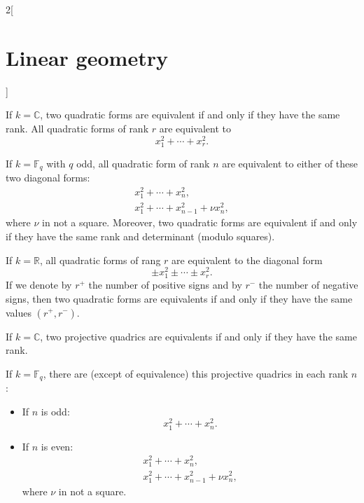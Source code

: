 \documentclass[class=article,10pt,crop=false]{standalone}
\begin{document}
\begin{multicols}{2}[\section{Linear geometry}]
\begin{prop}
\end{prop}
\begin{theorem}
If $k=\mathbb{C}$, two quadratic forms are equivalent if and only if they have the same rank. All quadratic forms of rank $r$ are equivalent to $$x_1^2+\cdots+x_r^2.$$
\end{theorem}
\begin{theorem}
If $k=\mathbb{F}_q$ with $q$ odd, all quadratic form
of rank $n$ are equivalent to either of these two diagonal forms: 
\begin{gather*}
    x_1^2+\cdots+ x_n^2,\\
    x_1^2+\cdots+ x_{n-1}^2+\nu x_n^2,
\end{gather*}
where $\nu$ in not a square. Moreover, two quadratic forms are equivalent if and only if they have the same rank and determinant (modulo squares).
\end{theorem}
\begin{theorem}
If $k=\mathbb{R}$, all quadratic forms
of rang $r$ are equivalent to the diagonal form 
$$\pm x_1^2\pm\cdots\pm x_r^2.$$ If we denote by $r^+$ the number of positive signs and by $r^-$ the number of negative signs, then two quadratic forms are equivalents if and only if they have the same values $(r^+,r^-)$.
\end{theorem}
\begin{theorem}
If $k=\mathbb{C}$, two projective quadrics are equivalents if and only if they have the same rank.
\end{theorem}
\begin{theorem}
If $k=\mathbb{F}_q$, there are (except of equivalence) this projective quadrics in each rank $n$:
\begin{itemize}
    \item If $n$ is odd: $$\displaystyle x_1^2+\cdots+ x_n^2.$$
    \item If $n$ is even: \begin{gather*}
    x_1^2+\cdots+ x_n^2,\\
    x_1^2+\cdots+ x_{n-1}^2+\nu x_n^2,
\end{gather*}
where $\nu$ in not a square.
\end{itemize}
\end{theorem}
\begin{theorem}

\end{theorem}
\end{multicols}
\end{document}

